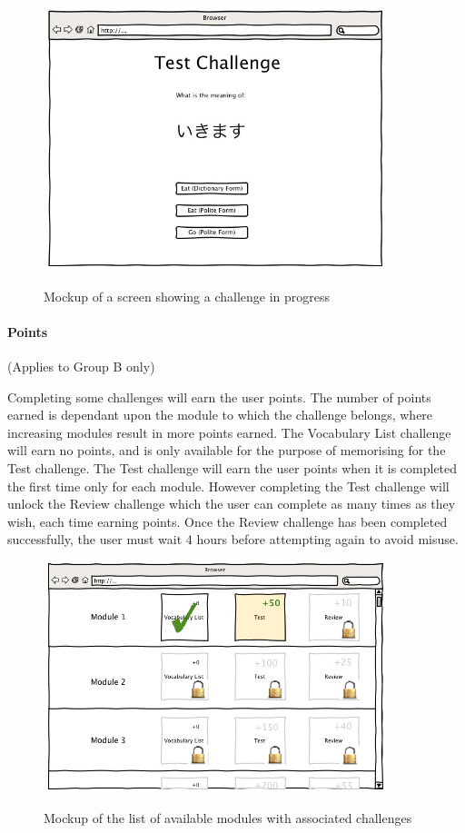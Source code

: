 \begin{figure}[H]
	\centering
		\includegraphics[width=10cm]{./screens/challenge.jpg}\\
		\caption{Mockup of a screen showing a challenge in progress}
\end{figure}

\paragraph{Points}
(Applies to Group B only)

Completing some challenges will earn the user points. The number of points earned is
dependant upon the module to which the challenge belongs, where increasing modules
result in more points earned. The Vocabulary List challenge will earn no points,
and is only available for the purpose of memorising for the Test challenge. The
Test challenge will earn the user points when it is completed the first time only
for each module. However completing the Test challenge will unlock the Review
challenge which the user can complete as many times as they wish, each time earning
points. Once the Review challenge has been completed successfully, the user must
wait 4 hours before attempting again to avoid misuse.


\begin{figure}[H]
	\centering
		\includegraphics[width=10cm]{./screens/modules.jpg}\\
		\caption{Mockup of the list of available modules with associated challenges}
\end{figure}

